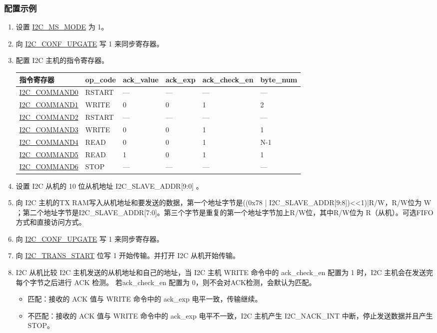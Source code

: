 \documentclass[main\_\_CN.tex]{subfiles}
\begin{document}
\subsubsection{配置示例}
\begin{enumerate}
\item 设置 \hyperref[fielddesc:I2CMSMODE]{I2C\_MS\_MODE} 为 1。
\item 向 \hyperref[fielddesc:I2CCONFUPGATE]{I2C\_CONF\_UPGATE} 写 1 来同步寄存器。
\item 配置 I2C 主机的指令寄存器。
\begin{longtable}{ | p{4cm} | p{2cm} | p{2cm} | p{2cm} |p{2cm} | p{2cm} |}
\hline\rowcolor{lightgray}
指令寄存器& op\_code & ack\_value&ack\_exp&ack\_check\_en&byte\_num  \\ \hline
\hyperref[fielddesc:I2CCOMMAND0]{I2C\_COMMAND0} & RSTART& ---&---&---&---  \\ \hline
\hyperref[fielddesc:I2CCOMMAND1]{I2C\_COMMAND1} & WRITE& 0&0&1&2  \\ \hline
\hyperref[fielddesc:I2CCOMMAND2]{I2C\_COMMAND2} & RSTART& ---&---&---&---  \\ \hline
\hyperref[fielddesc:I2CCOMMAND3]{I2C\_COMMAND3} & WRITE& 0&0&1&1  \\ \hline
\hyperref[fielddesc:I2CCOMMAND4]{I2C\_COMMAND4} & READ& 0&0&1&N-1  \\ \hline
\hyperref[fielddesc:I2CCOMMAND5]{I2C\_COMMAND5} & READ& 1&0&1&1  \\ \hline
\hyperref[fielddesc:I2CCOMMAND6]{I2C\_COMMAND6} & STOP& ---&---&---&---  \\ \hline
\end{longtable}

\item 设置 I2C 从机的 10 位从机地址 I2C\_SLAVE\_ADDR[9:0] 。
\item 向 I2C 主机的TX RAM写入从机地址和要发送的数据，第一个地址字节是((0x78 | I2C\_SLAVE\_ADDR[9:8])<<1)|R/W，R/W位为 W ；第二个地址字节是I2C\_SLAVE\_ADDR[7:0]。第三个字节是重复的第一个地址字节加上R/W位，其中R/W位为 R（从机）。可选FIFO方式和直接访问方式。

\item 向 \hyperref[fielddesc:I2CCONFUPGATE]{I2C\_CONF\_UPGATE} 写 1 来同步寄存器。
\item 向 \hyperref[fielddesc:I2CTRANSSTART]{I2C\_TRANS\_START} 位写 1 开始传输。并打开 I2C 从机开始传输。

\item I2C 从机比较 I2C 主机发送的从机地址和自己的地址，当 I2C 主机 WRITE 命令中的 ack\_check\_en 配置为 1 时，I2C 主机会在发送完每个字节之后进行 ACK 检测。 若ack\_check\_en 配置为 0，则不会对ACK检测，会默认为匹配。
\begin{itemize}
\item 匹配：接收的 ACK 值与 WRITE 命令中的 ack\_exp 电平一致，传输继续。
\item 不匹配：接收的 ACK 值与 WRITE 命令中的 ack\_exp 电平不一致，I2C 主机产生 I2C\_NACK\_INT 中断，停止发送数据并且产生 STOP。
\end{itemize}


\end{enumerate}
\end{document}
